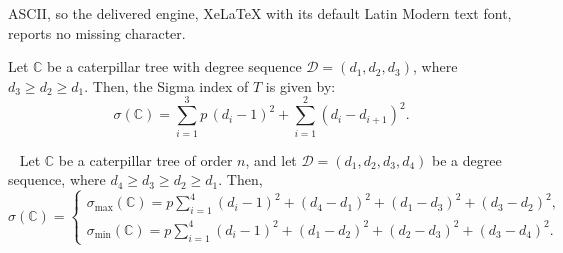 \documentclass[10pt,a4paper]{amsart}
\newcommand{\CC}{\mathbb{C}}
\begin{document}
ASCII, so the delivered engine, XeLaTeX with its default Latin Modern text font, reports no missing character.
\begin{lemma}\label{le.segma3}
Let $\CC$ be a caterpillar tree with degree sequence $ \mathscr{D} = (d_1, d_2, d_3) $, where $ d_3 \geqslant d_2 \geqslant d_1 $. Then, the Sigma index of $ T $ is given by:
\begin{equation}~\label{eqle.segma3n1}
\sigma(\CC)=\sum_{i=1}^{3} p\,(d_i-1)^2+\sum_{i=1}^{2}(d_i-d_{i+1})^2.
\end{equation}
\end{lemma}

\begin{theorem}~\label{le.sigma2}
Let $\CC$ be a caterpillar tree of order $n$, and let $\mathscr{D} = (d_1, d_2, d_3, d_4)$ be a degree sequence, where $d_4 \geqslant d_3 \geqslant d_2 \geqslant d_1$. Then, 
\[
\sigma(\CC)=\begin{cases}
\sigma_{\max}(\CC)=p \sum_{i=1}^{4} (d_i-1)^2+(d_4-d_1)^2+(d_1-d_3)^2+(d_3-d_2)^2, \\
 \sigma_{\min}(\CC)= p \sum_{i=1}^{4} (d_i-1)^2+(d_1-d_2)^2+(d_2-d_3)^2+(d_3-d_4)^2.
\end{cases}
\]
\end{theorem}
\end{document}
